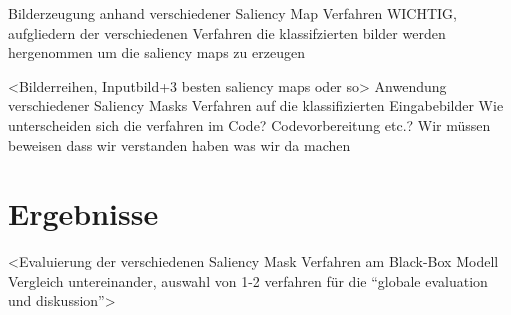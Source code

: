 Bilderzeugung anhand verschiedener Saliency Map Verfahren
WICHTIG, aufgliedern der verschiedenen Verfahren
die klassifzierten bilder werden hergenommen um die saliency maps zu erzeugen



<Bilderreihen, Inputbild+3 besten saliency maps oder so>
Anwendung verschiedener Saliency Masks Verfahren auf die klassifizierten Eingabebilder
Wie unterscheiden sich die verfahren im Code? Codevorbereitung etc.? Wir müssen beweisen dass wir verstanden haben was wir da machen


\section{Ergebnisse}

<Evaluierung der verschiedenen Saliency Mask Verfahren am Black-Box Modell
Vergleich untereinander, auswahl von 1-2 verfahren für die “globale evaluation und diskussion”>